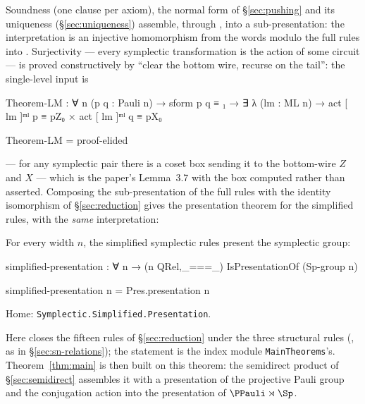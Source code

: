 Soundness (one clause per axiom), the normal form of \S\ref{sec:pushing}
and its uniqueness (\S\ref{sec:uniqueness}) assemble, through
, into a sub-presentation: the interpretation is an
injective homomorphism from the words modulo the full rules into
.  Surjectivity --- every symplectic transformation is the
action of some circuit --- is proved constructively by ``clear the bottom
wire, recurse on the tail'': the single-level input is

\begingroup\renewcommand{\AgdaCodeStyle}{\footnotesize}
\begin{code}
Theorem-LM : ∀ {n} (p q : Pauli n) → sform p q ≡ ₁ → ∃ λ (lm : ML n) → act [ lm ]ᵐˡ p ≡ pZ₀ × act [ lm ]ᵐˡ q ≡ pX₀
\end{code}
\endgroup
\begin{code}[hide]
Theorem-LM = proof-elided
\end{code}

--- for any symplectic pair there is a coset box sending it to the
bottom-wire $Z$ and $X$ --- which is the paper's Lemma~3.7 with the box
computed rather than asserted.  Composing the sub-presentation of the
full rules with the identity isomorphism of \S\ref{sec:reduction} gives
the presentation theorem for the simplified rules, with the \emph{same}
interpretation:

\begin{theorem}\label{thm:sp}
For every width $n$, the simplified symplectic rules present the
symplectic group:
\begin{code}
simplified-presentation : ∀ n → (n QRel,_===_) IsPresentationOf (Sp-group n)
\end{code}
\begin{code}[hide]
simplified-presentation n = Pres.presentation {n}
\end{code}
\noindent Home: \texttt{Symplectic.Simplified.Presentation}.
\end{theorem}

\noindent Here  closes the fifteen rules
 of \S\ref{sec:reduction} under the three
structural rules (, as in \S\ref{sec:sn-relations});
the statement is the index module \texttt{MainTheorems}'s.
Theorem~\ref{thm:main} is then built on
this theorem: the semidirect product of \S\ref{sec:semidirect}
assembles it with a presentation of the projective Pauli group and the
conjugation action into the presentation of $\PPauli \rtimes \Sp$.
